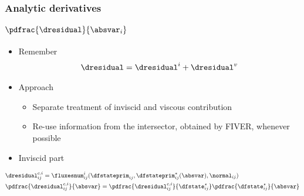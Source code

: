 
\begin{frame}
\frametitle{Analytic derivatives}
\framesubtitle{$\pdfrac{\dresidual}{\absvar_i}$}

\begin{itemize}
\item{Remember}
\begin{align*}
\dresidual=\dresidual^i+\dresidual^v
\end{align*}
\item{Approach}
	\begin{itemize}
		\item Separate treatment of inviscid and viscous contribution
		\item Re-use information from the intersector, obtained by FIVER, whenever possible
	\end{itemize}
\item Inviscid part

\end{itemize}

\begin{align*}
& \dresidual^{c,i}_{ij} = \fluxesnum^i_{ij}(\dfstateprim_{ij},\dfstateprim^{*}_{ij}(\absvar),\normal_{ij}) \\
& \pdfrac{\dresidual^{c,i}_{ij}}{\absvar}=\pdfrac{\dresidual^{c,i}_{ij}}{\dfstate^{\star}_{ij}}\pdfrac{\dfstate^{\star}_{ij}}{\absvar}
\end{align*}

\end{frame}



